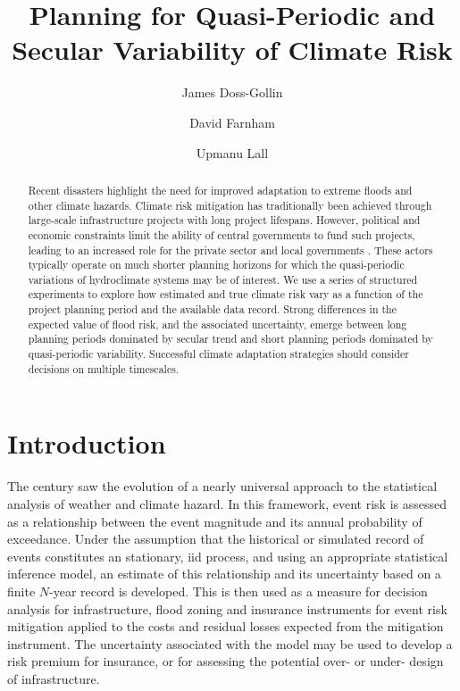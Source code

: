 \documentclass[12pt]{article}
\title{Planning for Quasi-Periodic and Secular Variability of Climate Risk}
\author[1,2]{James Doss-Gollin}
\author[1,2]{David Farnham}
\author[1,2]{Upmanu Lall}
\affil[1]{Columbia Water Center, Columbia University}
\affil[2]{Department of Earth and Environmental Engineering, Columbia University}
\begin{document}
\maketitle
\RaggedRight{}

\begin{abstract}
  Recent disasters highlight the need for improved adaptation to extreme floods and other climate hazards.
  Climate risk mitigation has traditionally been achieved through large-scale infrastructure projects with long project lifespans.
  However, political and economic constraints limit the ability of central governments to fund such projects, leading to an increased role for the private sector and local governments \citep{WorldEconomicForum2016}.
  These actors typically operate on much shorter planning horizons for which the quasi-periodic variations of hydroclimate systems may be of interest.
  We use a series of structured experiments to explore how estimated and true climate risk vary as a function of the project planning period and the available data record.
  Strong differences in the expected value of flood risk, and the associated uncertainty, emerge between long planning periods dominated by secular trend and short planning periods dominated by quasi-periodic variability.
  Successful climate adaptation strategies should consider decisions on multiple timescales.
\end{abstract}


\section{Introduction}\label{sec:introduction}

The  century saw the evolution of a nearly universal approach to the statistical analysis of weather and climate hazard.
In this framework, event risk is assessed as a relationship between the event magnitude and its annual probability of exceedance.
Under the assumption that the historical or simulated record of events constitutes an stationary, \gls{iid} process, and using an appropriate statistical inference model, an estimate of this relationship and its uncertainty based on a finite $N$-year record is developed.
This is then used as a measure for decision analysis for infrastructure, flood zoning and insurance instruments for event risk mitigation applied to the costs and residual losses expected from the mitigation instrument.
The uncertainty associated with the model may be used to develop a risk premium for insurance, or for assessing the potential over- or under- design of infrastructure.
\end{document}
